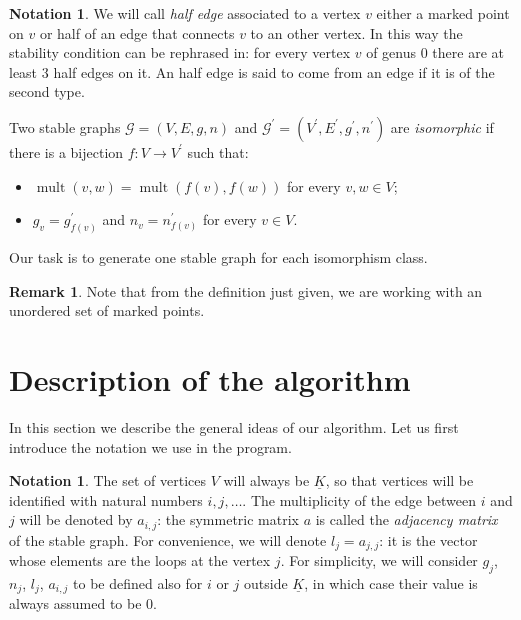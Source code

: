 \documentclass{amsart}
\theoremstyle{plain}
\theoremstyle{definition}
\newtheorem{remark}[theorem]{Remark}
\newtheorem{notation}[theorem]{Notation}
\DeclareMathOperator{\mult}{mult}
\newcommand{\graph}{\mathcal{G}}
\newcommand{\ubar}[1]{\underline{#1}}
\begin{document}
\begin{notation}
  We will call \emph{half edge} associated to a vertex $v$ either a
  marked point on $v$ or half of an edge that connects $v$ to an other
  vertex. In this way the stability condition can be rephrased in: for
  every vertex $v$ of genus $0$ there are at least $3$ half edges on
  it. An half edge is said to come from an edge if it is of the
  second type.
\end{notation}

Two stable graphs $\graph = (V, E, g, n)$ and $\graph^\prime =
(V^\prime, E^\prime, g^\prime, n^\prime)$ are \emph{isomorphic\/} if
there is a bijection $f\colon V \to V^\prime$ such that:
\begin{itemize}
\item $\mult(v, w) = \mult(f(v), f(w))$ for every $v, w \in V$;
\item $g_v = g^\prime_{f(v)}$ and $n_v = n^\prime_{f(v)}$ for every $v
  \in V$.
\end{itemize}
Our task is to generate one stable graph for each isomorphism class.

\begin{remark}
  Note that from the definition just given, we are working with an
  unordered set of marked points.
\end{remark}



\section{Description of the algorithm}\label{sec:description}

In this section we describe the general ideas of our algorithm. Let us
first introduce the notation we use in the program.

\begin{notation}\label{not:gnla}
  The set of vertices $V$ will always be $\ubar{K}$, so that vertices
  will be identified with natural numbers $i, j, \dots$. The
  multiplicity of the edge between $i$ and $j$ will be denoted by
  $a_{i,j}$: the symmetric matrix $a$ is called the \emph{adjacency
    matrix} of the stable graph. For convenience, we will denote $l_j
  = a_{j,j}$: it is the vector whose elements are the loops at the
  vertex $j$. For simplicity, we will consider $g_j$, $n_j$, $l_j$,
  $a_{i,j}$ to be defined also for $i$ or $j$ outside $\ubar{K}$, in
  which case their value is always assumed to be $0$.
\end{notation}
\end{document}
